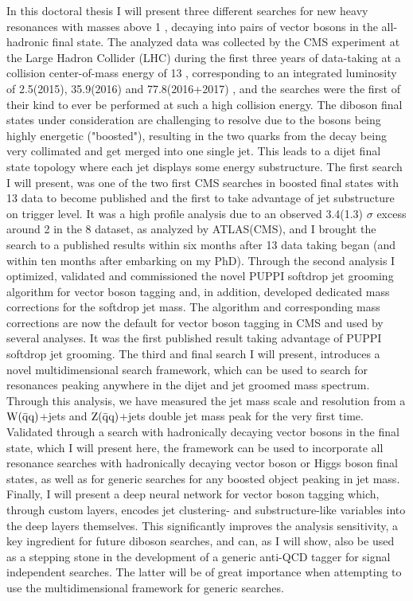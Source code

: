\small
\noindent In this doctoral thesis I will present three different searches for new heavy resonances with masses above 1 \TeV, decaying into pairs of vector bosons in the all-hadronic final state. The analyzed data was collected by the CMS experiment at the Large Hadron Collider (LHC) during the first three years of data-taking at a collision center-of-mass energy of 13 \TeV, corresponding to an integrated luminosity of 2.5(2015), 35.9(2016) and 77.8(2016+2017) \fbinv, and the searches were the first of their kind to ever be performed at such a high collision energy. The diboson final states under consideration are challenging to resolve due to the bosons being highly energetic ("boosted"), resulting in the two quarks from the decay being very collimated and get merged into one single jet. This leads to a dijet final state topology where each jet displays some energy substructure.
\newline
The first search I will present, was one of the two first CMS searches in boosted final states with 13 \TeV data to become published and the first to take advantage of jet substructure on trigger level. It was a high profile analysis due to an observed 3.4(1.3) $\sigma$ excess around 2 \TeV in the 8 \TeV dataset, as analyzed by ATLAS(CMS), and I brought the search to a published results within six months after 13 \TeV data taking began (and within ten months after embarking on my PhD). Through the second analysis I optimized, validated and commissioned the novel PUPPI softdrop jet grooming algorithm for vector boson tagging and, in addition, developed dedicated mass corrections for the softdrop jet mass. The algorithm and corresponding mass corrections are now the default for vector boson tagging in CMS and used by several analyses. It was the first published result taking advantage of PUPPI softdrop jet grooming. The third and final search I will present, introduces a novel multidimensional search framework, which can be used to search for resonances peaking anywhere in the dijet and jet groomed mass spectrum. Through this analysis, we have measured the jet mass scale and resolution from a $\mathrm{W}(\bar{\rm{q}}\rm{q})$+jets and $\mathrm{Z}(\bar{\rm{q}}\rm{q})$+jets double jet mass peak for the very first time. Validated through a search with hadronically decaying vector bosons in the final state, which I will present here, the framework can be used to incorporate all resonance searches with hadronically decaying vector boson or Higgs boson final states, as well as for generic searches for any boosted object peaking in jet mass.
\newline
Finally, I will present a deep neural network for vector boson tagging which, through custom layers, encodes jet clustering- and substructure-like variables into the deep layers themselves. This significantly improves the analysis sensitivity, a key ingredient for future diboson searches, and can, as I will show, also be used as a stepping stone in the development of a generic anti-QCD tagger for signal independent searches. The latter will be of great importance when attempting to use the multidimensional framework for generic searches.